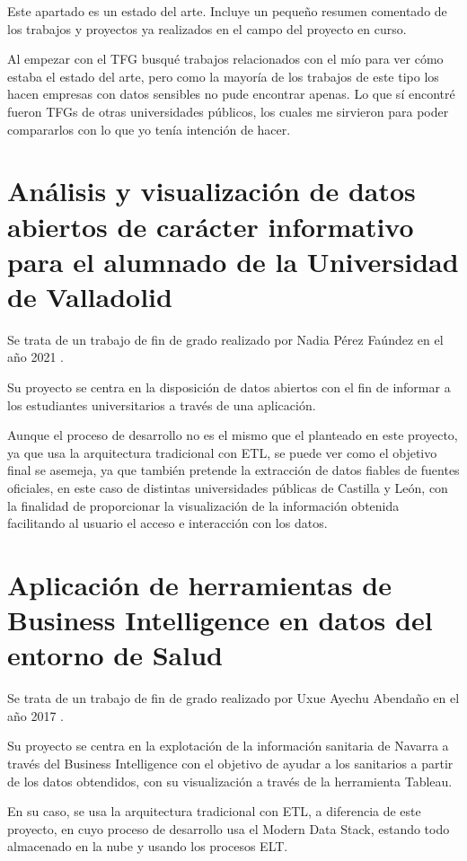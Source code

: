 
Este apartado es un estado del arte. Incluye un pequeño resumen comentado de los trabajos y proyectos ya realizados en el campo del proyecto en curso. 

Al empezar con el TFG busqué trabajos relacionados con el mío para ver cómo estaba el estado del arte, pero como la mayoría de los trabajos de este tipo los hacen empresas con datos sensibles no pude encontrar apenas. Lo que sí encontré fueron TFGs de otras universidades públicos, los cuales me sirvieron para poder compararlos con lo que yo tenía intención de hacer.

\section{Análisis y visualización de datos abiertos de 
carácter informativo para el alumnado de la 
Universidad de Valladolid}

Se trata de un trabajo de fin de grado realizado por Nadia Pérez Faúndez en el año 2021 \cite{TFG1}.

Su proyecto se centra en la disposición de datos abiertos con el fin de informar a los estudiantes universitarios a través de una aplicación. 

Aunque el proceso de desarrollo no es el mismo que el planteado en este proyecto, ya que usa la arquitectura tradicional con ETL, se puede ver como el objetivo final se asemeja, ya que también pretende la extracción de datos fiables de fuentes oficiales, en este caso de distintas universidades públicas de Castilla y León, con la finalidad de proporcionar la visualización de la información obtenida facilitando al usuario el acceso e interacción con los datos.


\section{Aplicación de herramientas de Business Intelligence en datos del entorno de Salud}
Se trata de un trabajo de fin de grado realizado por Uxue Ayechu Abendaño en el año 2017 \cite{TFG2}.

Su proyecto se centra en la explotación de la información sanitaria de Navarra a través del Business Intelligence con el objetivo de ayudar a los sanitarios a partir de los datos obtendidos, con su visualización a través de la herramienta Tableau.

En su caso, se usa la arquitectura tradicional con ETL, a diferencia de este proyecto, en cuyo proceso de desarrollo usa el Modern Data Stack, estando todo almacenado en la nube y usando los procesos ELT.

